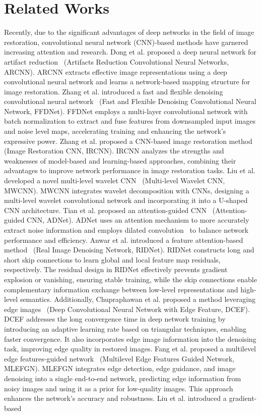 \section{Related Works}
Recently, due to the significant advantages of deep networks in the field of image restoration, convolutional neural network (CNN)-based methods have garnered increasing attention and research. Dong et al. proposed a deep neural network for artifact reduction~\cite{dong2015compression} (Artifacts Reduction Convolutional Neural Networks, ARCNN). ARCNN extracts effective image representations using a deep convolutional neural network and learns a network-based mapping structure for image restoration. Zhang et al. introduced a fast and flexible denoising convolutional neural network~\cite{zhang2018ffdnet} (Fast and Flexible Denoising Convolutional Neural Network, FFDNet). FFDNet employs a multi-layer convolutional network with batch normalization to extract and fuse features from downsampled input images and noise level maps, accelerating training and enhancing the network's expressive power. Zhang et al. proposed a CNN-based image restoration method~\cite{zhang2017learning} (Image Restoration CNN, IRCNN). IRCNN analyzes the strengths and weaknesses of model-based and learning-based approaches, combining their advantages to improve network performance in image restoration tasks. Liu et al. developed a novel multi-level wavelet CNN~\cite{liu2018multi} (Multi-level Wavelet CNN, MWCNN). MWCNN integrates wavelet decomposition with CNNs, designing a multi-level wavelet convolutional network and incorporating it into a U-shaped CNN architecture. Tian et al. proposed an attention-guided CNN~\cite{tian2020attention} (Attention-guided CNN, ADNet). ADNet uses an attention mechanism to more accurately extract noise information and employs dilated convolution~\cite{yu2015multi} to balance network performance and efficiency. Anwar et al. introduced a feature attention-based method~\cite{anwar2019real} (Real Image Denoising Network, RIDNet). RIDNet constructs long and short skip connections to learn global and local feature map residuals, respectively. The residual design in RIDNet effectively prevents gradient explosion or vanishing, ensuring stable training, while the skip connections enable complementary information exchange between low-level representations and high-level semantics. Additionally, Chupraphawan et al. proposed a method leveraging edge images~\cite{chupraphawan2019deep} (Deep Convolutional Neural Network with Edge Feature, DCEF). DCEF addresses the long convergence time in deep network training by introducing an adaptive learning rate based on triangular techniques, enabling faster convergence. It also incorporates edge image information into the denoising task, improving edge quality in restored images. Fang et al. proposed a multilevel edge features-guided network~\cite{fang2020multilevel} (Multilevel Edge Features Guided Network, MLEFGN). MLEFGN integrates edge detection, edge guidance, and image denoising into a single end-to-end network, predicting edge information from noisy images and using it as a prior for low-quality images. This approach enhances the network's accuracy and robustness. Liu et al. introduced a gradient-based 
